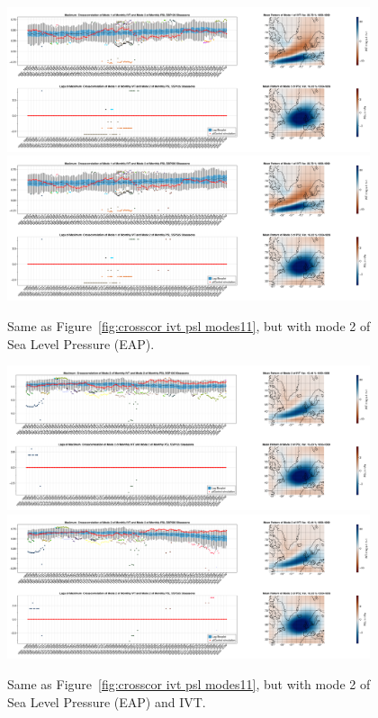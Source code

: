 \begin{figure}
  \begin{center}
    \includegraphics[width=0.95\textwidth]{figures/crosscorrelation_boxplot_ivt_psl_modes12_ssp126_50seasons.png}
    \includegraphics[width=0.95\textwidth]{figures/crosscorrelation_boxplot_ivt_psl_modes12_ssp585_50seasons.png}
  \end{center}
  \caption{Same as Figure~\ref{fig:crosscor ivt psl modes11}, but with mode 2 of Sea Level Pressure (EAP).}
  \label{fig:crosscor ivt psl modes12}
\end{figure}

\begin{figure}
  \begin{center}
    \includegraphics[width=0.95\textwidth]{figures/crosscorrelation_boxplot_ivt_psl_modes22_ssp126_50seasons.png}
    \includegraphics[width=0.95\textwidth]{figures/crosscorrelation_boxplot_ivt_psl_modes22_ssp585_50seasons.png}
  \end{center}
  \caption{Same as Figure~\ref{fig:crosscor ivt psl modes11}, but with mode 2 of Sea Level Pressure (EAP) and IVT.}
  \label{fig:crosscor ivt psl modes22}
\end{figure}


